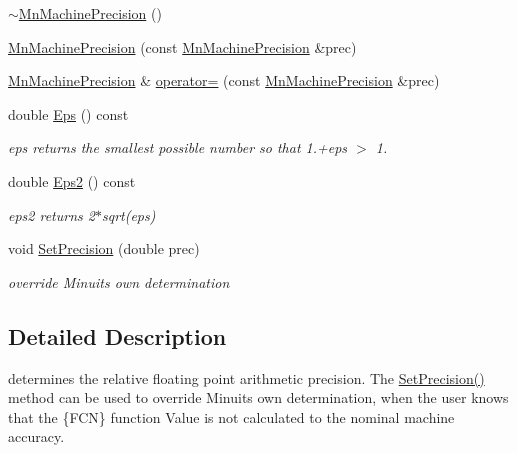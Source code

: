 \begin{DoxyCompactItemize}
\item 
\mbox{\hyperlink{classROOT_1_1Minuit2_1_1MnMachinePrecision_abcef7b80562b246252decc15b6fabc71}{$\sim$\+Mn\+Machine\+Precision}} ()
\item 
\mbox{\hyperlink{classROOT_1_1Minuit2_1_1MnMachinePrecision_a7b8520f8d3479d7dd1b91a3bc3236281}{Mn\+Machine\+Precision}} (const \mbox{\hyperlink{classROOT_1_1Minuit2_1_1MnMachinePrecision}{Mn\+Machine\+Precision}} \&prec)
\item 
\mbox{\hyperlink{classROOT_1_1Minuit2_1_1MnMachinePrecision}{Mn\+Machine\+Precision}} \& \mbox{\hyperlink{classROOT_1_1Minuit2_1_1MnMachinePrecision_a89ded7be0c8fe34ad55585e45a078355}{operator=}} (const \mbox{\hyperlink{classROOT_1_1Minuit2_1_1MnMachinePrecision}{Mn\+Machine\+Precision}} \&prec)
\item 
double \mbox{\hyperlink{classROOT_1_1Minuit2_1_1MnMachinePrecision_a3a56da6043c5df1a98e5c8b1aa9f6d9f}{Eps}} () const
\begin{DoxyCompactList}\small\item\em eps returns the smallest possible number so that 1.+eps $>$ 1. \end{DoxyCompactList}\item 
double \mbox{\hyperlink{classROOT_1_1Minuit2_1_1MnMachinePrecision_aa71de131bc08f19d18dfeba4cb8191ce}{Eps2}} () const
\begin{DoxyCompactList}\small\item\em eps2 returns 2$\ast$sqrt(eps) \end{DoxyCompactList}\item 
void \mbox{\hyperlink{classROOT_1_1Minuit2_1_1MnMachinePrecision_a625938e3c6362a06d09fc76e59f366b6}{Set\+Precision}} (double prec)
\begin{DoxyCompactList}\small\item\em override Minuit\textquotesingle{}s own determination \end{DoxyCompactList}\end{DoxyCompactItemize}


\subsection{Detailed Description}
determines the relative floating point arithmetic precision. The \mbox{\hyperlink{classROOT_1_1Minuit2_1_1MnMachinePrecision_a625938e3c6362a06d09fc76e59f366b6}{Set\+Precision()}} method can be used to override Minuit\textquotesingle{}s own determination, when the user knows that the \{F\+CN\} function Value is not calculated to the nominal machine accuracy. 

